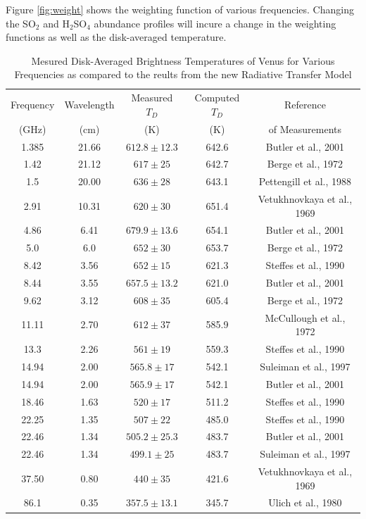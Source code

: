 Figure \ref{fig:weight} shows the weighting function of various frequencies. Changing the SO$_2$ and H$_2$SO$_4$ abundance profiles will incure a change in the weighting functions as well as the disk-averaged temperature.
\begin{table}[h]
 \centering 
\caption{Mesured Disk-Averaged Brightness Temperatures of Venus for Various Frequencies as compared to the reults from the new Radiative Transfer Model}
\begin{tabular}{||c|c|c|c|c||}
\hline
Frequency & Wavelength & Measured $T_D$ & Computed $T_D$ & Reference\\
(GHz) & (cm) &(K)&(K)& of Measurements\\
\hline
1.385 	& 21.66	 	&$612.8 \pm 12.3$	&642.6  &Butler et al., 2001 			\cite{Butler-2001}\\
1.42 	& 21.12 	&$617 	\pm 25$		&642.7  &Berge et al., 1972 			\cite{Berge-1972}\\
1.5 	& 20.00 	&$636 	\pm 28$		&643.1  &Pettengill et al., 1988 		\cite{Pettengill-1988}\\
2.91 	& 10.31 	&$620 	\pm 30$		&651.4  &Vetukhnovkaya et al., 1969 	\cite{Vetukhnovkaya-1969}\\
4.86 	& 6.41	 	&$679.9 \pm 13.6$	&654.1  &Butler et al., 2001 			\cite{Butler-2001}\\
5.0 	& 6.0 		&$652 	\pm 30$		&653.7  &Berge et al., 1972 			\cite{Berge-1972}\\
8.42 	& 3.56	 	&$652 	\pm 15$		&621.3  &Steffes et al., 1990 			\cite{Steffes-1990}\\
8.44 	& 3.55	 	&$657.5 \pm 13.2$	&621.0  &Butler et al., 2001 			\cite{Butler-2001}\\
9.62 	& 3.12	 	&$608 	\pm 35$		&605.4  &Berge et al., 1972 			\cite{Berge-1972}\\
11.11 	& 2.70	 	&$612 	\pm 37$		&585.9  &McCullough et al., 1972 		\cite{McCullough-1972}\\
13.3	& 2.26	 	&$561 	\pm 19$		&559.3  &Steffes et al., 1990			\cite{Steffes-1990}\\
14.94 	& 2.00	 	&$565.8 \pm 17$		&542.1  &Suleiman et al., 1997 			\cite{Suleiman-thesis}\\
14.94 	& 2.00	 	&$565.9 \pm 17$		&542.1  &Butler et al., 2001 			\cite{Butler-2001}\\
18.46 	& 1.63	 	&$520 	\pm 17$		&511.2  &Steffes et al., 1990			\cite{Steffes-1990}\\
22.25 	& 1.35	 	&$507 	\pm 22$		&485.0  &Steffes et al., 1990			\cite{Steffes-1990}\\
22.46 	& 1.34	 	&$505.2 \pm 25.3$	&483.7  &Butler et al., 2001 			\cite{Butler-2001}\\
22.46 	& 1.34	 	&$499.1 \pm 25$		&483.7  &Suleiman et al., 1997 			\cite{Suleiman-thesis}\\
37.50 	& 0.80	 	&$440 	\pm 35$		&421.6  &Vetukhnovkaya et al., 1969 	\cite{Vetukhnovkaya-1969}\\
86.1 	& 0.35	 	&$357.5	\pm 13.1$	&345.7  &Ulich et al., 1980 			\cite{Ulich-1980}\\
\hline
\end{tabular}
\label{tab:rtm-results}
\end{table}

